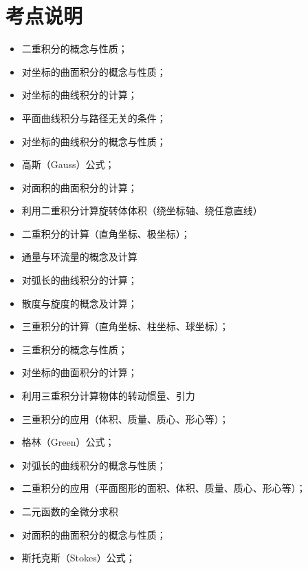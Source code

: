 \section{考点说明}
\begin{itemize}
\item 二重积分的概念与性质；
\item 对坐标的曲面积分的概念与性质；
\item 对坐标的曲线积分的计算；
\item 平面曲线积分与路径无关的条件；
\item 对坐标的曲线积分的概念与性质；
\item 高斯（Gauss）公式；
\item 对面积的曲面积分的计算；
\item 利用二重积分计算旋转体体积（绕坐标轴、绕任意直线）
\item 二重积分的计算（直角坐标、极坐标）；
\item 通量与环流量的概念及计算
\item 对弧长的曲线积分的计算；
\item 散度与旋度的概念及计算；
\item 三重积分的计算（直角坐标、柱坐标、球坐标）；
\item 三重积分的概念与性质；
\item 对坐标的曲面积分的计算；
\item 利用三重积分计算物体的转动惯量、引力
\item 三重积分的应用（体积、质量、质心、形心等）；
\item 格林（Green）公式；
\item 对弧长的曲线积分的概念与性质；
\item 二重积分的应用（平面图形的面积、体积、质量、质心、形心等）；
\item 二元函数的全微分求积
\item 对面积的曲面积分的概念与性质；
\item 斯托克斯（Stokes）公式；
\end{itemize}

